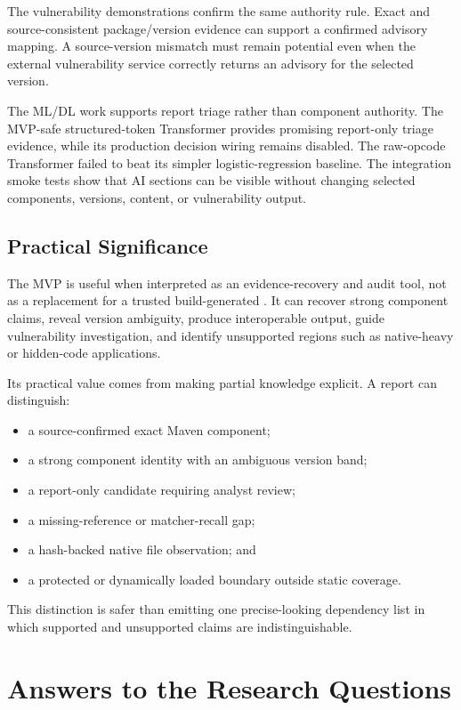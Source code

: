 The vulnerability demonstrations confirm the same authority rule. Exact and
source-consistent package/version evidence can support a confirmed advisory
mapping. A source-version mismatch must remain potential even when the
external vulnerability service correctly returns an advisory for the selected
version.

The ML/DL work supports report triage rather than component authority. The
MVP-safe structured-token Transformer provides promising report-only triage
evidence, while its production decision wiring remains disabled. The
raw-opcode Transformer failed to beat its simpler logistic-regression
baseline. The integration smoke tests show that AI sections can be visible
without changing selected components, versions, \CycloneDX content, or
vulnerability output.

\subsection{Practical Significance}

The MVP is useful when interpreted as an evidence-recovery and audit tool, not
as a replacement for a trusted build-generated \SBOM. It can recover strong
component claims, reveal version ambiguity, produce interoperable output,
guide vulnerability investigation, and identify unsupported regions such as
native-heavy or hidden-code applications.

Its practical value comes from making partial knowledge explicit. A report can
distinguish:

\begin{itemize}
  \item a source-confirmed exact Maven component;
  \item a strong component identity with an ambiguous version band;
  \item a report-only candidate requiring analyst review;
  \item a missing-reference or matcher-recall gap;
  \item a hash-backed native file observation; and
  \item a protected or dynamically loaded boundary outside static coverage.
\end{itemize}

This distinction is safer than emitting one precise-looking dependency list in
which supported and unsupported claims are indistinguishable.

\section{Answers to the Research Questions}

